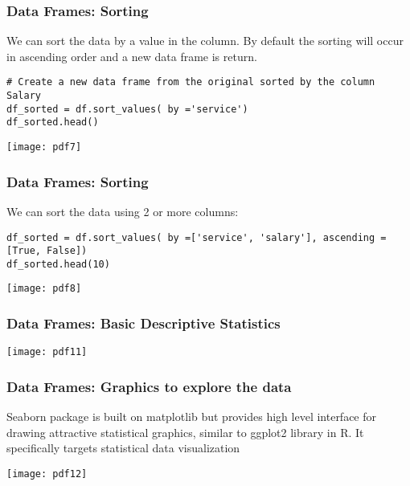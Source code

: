 \begin{frame}[fragile]
\frametitle{Data Frames: Sorting}
We can sort the data by a value in the column. By default the sorting will occur in ascending order and a new data frame is return. 
\begin{lstlisting}
# Create a new data frame from the original sorted by the column Salary
df_sorted = df.sort_values( by ='service')
df_sorted.head()
\end{lstlisting}
\begin{center}
\texttt{[image: pdf7]}
\end{center}
\end{frame}

\begin{frame}[fragile]
\frametitle{Data Frames: Sorting}
We can sort the data using 2 or more columns:
\begin{lstlisting}
df_sorted = df.sort_values( by =['service', 'salary'], ascending = [True, False])
df_sorted.head(10)
\end{lstlisting}
\begin{center}
\texttt{[image: pdf8]}
\end{center}
\end{frame}

\begin{frame}[fragile]
\frametitle{Data Frames: Basic Descriptive Statistics}
\begin{center}
\texttt{[image: pdf11]}
\end{center}
\end{frame}

\begin{frame}[fragile]
\frametitle{Data Frames: Graphics to explore the data}
Seaborn package is built on matplotlib but provides high level interface for drawing attractive statistical graphics, similar to ggplot2 library in R. 
It specifically targets statistical data visualization

\begin{center}
\texttt{[image: pdf12]}
\end{center}
\end{frame}


